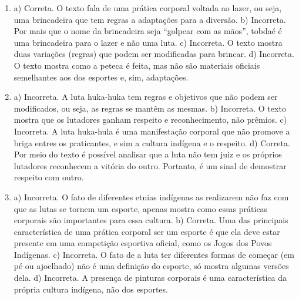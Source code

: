 \begin{enumerate}
\item
a) Correta. O texto fala de uma prática corporal voltada ao lazer, ou
seja, uma brincadeira que tem regras a adaptações para a diversão.
b) Incorreta. Por mais que o nome da brincadeira seja “golpear com as
mãos”, tobdaé é uma brincadeira para o lazer e não uma luta.
c) Incorreta. O texto mostra duas variações (regras) que podem ser
modificadas para brincar.
d) Incorreta. O texto mostra como a peteca é feita, mas não são
materiais oficiais semelhantes aos dos esportes e, sim, adaptações.

\item
a) Incorreta. A luta huka-huka tem regras e objetivos que não podem ser
modificados, ou seja, as regras se mantêm as mesmas.
b) Incorreta. O texto mostra que os lutadores ganham respeito e
reconhecimento, não prêmios.
c) Incorreta. A luta huka-hula é uma manifestação corporal que não
promove a briga entres os praticantes, e sim a cultura indígena e o
respeito.
d) Correta. Por meio do texto é possível analisar que a luta não tem
juiz e os próprios lutadores reconhecem a vitória do outro. Portanto, é
um sinal de demostrar respeito com outro.

\item
a) Incorreta. O fato de diferentes etnias indígenas as realizarem não faz com que as
lutas se tornem um esporte, apenas mostra como essas práticas corporais
são importantes para essa cultura.
b) Correta. Uma das principais característica de uma prática corporal
ser um esporte é que ela deve estar presente em uma competição esportiva
oficial, como os Jogos dos Povos Indígenas.
c) Incorreta. O fato de a luta ter diferentes formas de começar (em pé ou
ajoelhado) não é uma definição do esporte, só mostra algumas versões dela.
d) Incorreta. A presença de pinturas corporais é uma característica da própria
cultura indígena, não dos esportes.
\end{enumerate}


